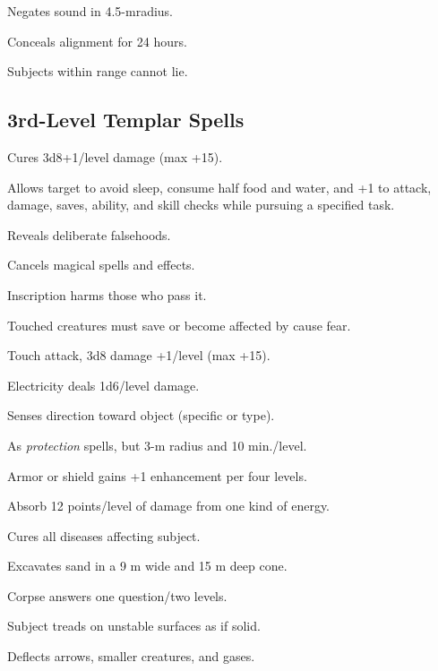  Negates sound in 4.5-mradius.

 Conceals alignment for 24 hours.

 Subjects within range cannot lie.



\subsection{3rd-Level Templar Spells}

 Cures 3d8+1/level damage (max +15).

 Allows target to avoid sleep, consume half food and water, and +1 to attack, damage, saves, ability, and skill checks while pursuing a specified task.

 Reveals deliberate falsehoods.

 Cancels magical spells and effects.

 Inscription harms those who pass it.

 Touched creatures must save or become affected by cause fear.

 Touch attack, 3d8 damage +1/level (max +15).

 Electricity deals 1d6/level damage.

 Senses direction toward object (specific or type).

 As \emph{protection} spells, but 3-m radius and 10 min./level.

 Armor or shield gains +1 enhancement per four levels.

 Absorb 12 points/level of damage from one kind of energy.

 Cures all diseases affecting subject.

 Excavates sand in a 9 m wide and 15 m deep cone.

 Corpse answers one question/two levels.

 Subject treads on unstable surfaces as if solid.

 Deflects arrows, smaller creatures, and gases.

